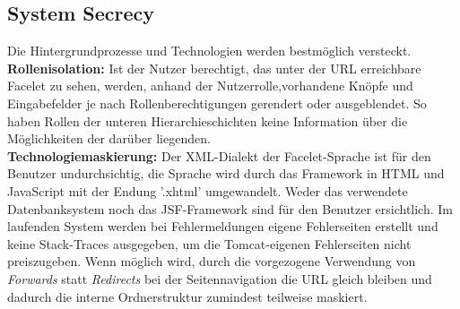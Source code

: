 \documentclass{article}
\begin{document}
\subsection{System Secrecy}
Die Hintergrundprozesse und Technologien werden bestmöglich versteckt.\\
\textbf{Rollenisolation:} Ist der Nutzer berechtigt, das unter der URL erreichbare Facelet zu sehen, werden, anhand der Nutzerrolle,vorhandene Knöpfe und Eingabefelder je nach Rollenberechtigungen gerendert oder ausgeblendet. So haben Rollen der unteren Hierarchieschichten keine Information über die Möglichkeiten der darüber liegenden.\\
\textbf{Technologiemaskierung:} Der XML-Dialekt der Facelet-Sprache ist für den Benutzer undurchsichtig, die Sprache wird durch das Framework in HTML und JavaScript mit der Endung '.xhtml' umgewandelt. Weder das verwendete Datenbanksystem noch das JSF-Framework sind für den Benutzer ersichtlich. Im laufenden System werden bei Fehlermeldungen eigene Fehlerseiten erstellt und keine Stack-Traces ausgegeben, um die Tomcat-eigenen Fehlerseiten nicht preiszugeben. Wenn möglich wird, durch die vorgezogene Verwendung von \textit{Forwards} statt \textit{Redirects} bei der Seitennavigation die URL gleich bleiben und dadurch die interne Ordnerstruktur zumindest teilweise maskiert.
\end{document}
